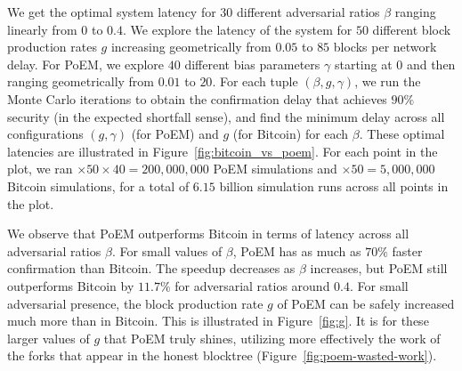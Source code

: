 We get the optimal system latency for $30$ different adversarial ratios $\beta$ ranging linearly from $0$ to $0.4$.
We explore the latency of the system for $50$ different block production rates $g$ increasing geometrically from $0.05$ to $85$ blocks per network delay.
For PoEM, we explore $40$ different bias parameters $\gamma$ starting at $0$ and then ranging geometrically from $0.01$ to $20$.
For each tuple $(\beta, g, \gamma)$, we run the \montecarlo{} Monte Carlo iterations to obtain the
confirmation delay that achieves $90\%$ security (in the expected shortfall sense), and find the minimum delay across all configurations $(g, \gamma)$ (for PoEM)
and $g$ (for Bitcoin) for each $\beta$.
These optimal latencies are illustrated in Figure~\ref{fig:bitcoin_vs_poem}.
For each point in the plot, we ran \montecarlo$ \times 50 \times 40 = 200{,}000{,}000$ PoEM simulations
and \montecarlo$ \times 50 = 5{,}000{,}000$ Bitcoin simulations,
for a total of $6.15$ billion simulation runs across all points in the plot.

We observe that PoEM outperforms Bitcoin in terms of latency across all adversarial ratios $\beta$.
For small values of $\beta$, PoEM has as much as $70\%$ faster confirmation than Bitcoin.
The speedup decreases as $\beta$ increases, but PoEM still outperforms Bitcoin by $11.7\%$ for adversarial ratios around $0.4$.
For small adversarial presence, the block production rate $g$ of PoEM can be safely increased much more than in Bitcoin.
This is illustrated in Figure~\ref{fig:g}.
It is for these larger values of $g$ that PoEM truly shines, utilizing more effectively the work of the
forks that appear in the honest blocktree (Figure~\ref{fig:poem-wasted-work}).

